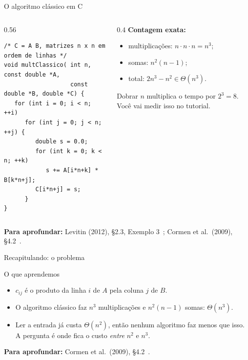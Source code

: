 \documentclass[aspectratio=169,xcolor=table]{beamer}
\newcommand{\fonte}[1]{%
  \vfill
  {\tiny\color{gray!55!black}\textbf{Para aprofundar:} #1\par}%
}
\begin{document}
\begin{frame}[fragile]{O algoritmo clássico em C}
  \begin{columns}[T]
    \begin{column}{0.56\textwidth}
\begin{lstlisting}
/* C = A B, matrizes n x n em ordem de linhas */
void multClassico( int n, const double *A,
                   const double *B, double *C) {
   for (int i = 0; i < n; ++i)
      for (int j = 0; j < n; ++j) {
         double s = 0.0;
         for (int k = 0; k < n; ++k)
            s += A[i*n+k] * B[k*n+j];
         C[i*n+j] = s;
      }
}
\end{lstlisting}
    \end{column}
    \begin{column}{0.4\textwidth}
      \scriptsize
      \textbf{Contagem exata:}
      \begin{itemize}\scriptsize
        \item multiplicações: $n\cdot n\cdot n = n^3$;
        \item somas: $n^2(n-1)$;
        \item total: $2n^3-n^2 \in \Theta(n^3)$.
      \end{itemize}
      \medskip
      Dobrar $n$ multiplica o tempo por $2^3 = 8$.
      Você vai medir isso no tutorial.
    \end{column}
  \end{columns}
  \fonte{Levitin (2012), \S 2.3, Exemplo 3~\cite{levitin2012introduction};
    Cormen et al.\ (2009), \S 4.2~\cite{cormen2009introduction}.}
\end{frame}

\begin{frame}{Recapitulando: o problema}
  \begin{block}{O que aprendemos}
    \begin{itemize}\scriptsize
      \item $c_{ij}$ é o produto da linha $i$ de $A$ pela coluna $j$ de $B$.
      \item O algoritmo clássico faz $n^3$ multiplicações e $n^2(n-1)$ somas: $\Theta(n^3)$.
      \item Ler a entrada já custa $\Theta(n^2)$, então nenhum algoritmo faz menos que isso.
            A pergunta é onde fica o custo \emph{entre} $n^2$ e $n^3$.
    \end{itemize}
  \end{block}
  \fonte{Cormen et al.\ (2009), \S 4.2~\cite{cormen2009introduction}.}
\end{frame}
\end{document}
